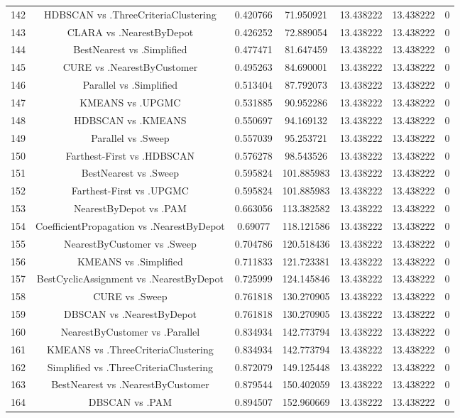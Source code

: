 \documentclass[a4paper,10pt]{article}
\begin{document}
\begin{landscape}
\begin{table}[!htp]
\begin{tabular}{ccccccc}
142&HDBSCAN vs .ThreeCriteriaClustering&0.420766&71.950921&13.438222&13.438222&0\\
143&CLARA vs .NearestByDepot&0.426252&72.889054&13.438222&13.438222&0\\
144&BestNearest vs .Simplified&0.477471&81.647459&13.438222&13.438222&0\\
145&CURE vs .NearestByCustomer&0.495263&84.690001&13.438222&13.438222&0\\
146&Parallel vs .Simplified&0.513404&87.792073&13.438222&13.438222&0\\
147&KMEANS vs .UPGMC&0.531885&90.952286&13.438222&13.438222&0\\
148&HDBSCAN vs .KMEANS&0.550697&94.169132&13.438222&13.438222&0\\
149&Parallel vs .Sweep&0.557039&95.253721&13.438222&13.438222&0\\
150&Farthest-First vs .HDBSCAN&0.576278&98.543526&13.438222&13.438222&0\\
151&BestNearest vs .Sweep&0.595824&101.885983&13.438222&13.438222&0\\
152&Farthest-First vs .UPGMC&0.595824&101.885983&13.438222&13.438222&0\\
153&NearestByDepot vs .PAM&0.663056&113.382582&13.438222&13.438222&0\\
154&CoefficientPropagation vs .NearestByDepot&0.69077&118.121586&13.438222&13.438222&0\\
155&NearestByCustomer vs .Sweep&0.704786&120.518436&13.438222&13.438222&0\\
156&KMEANS vs .Simplified&0.711833&121.723381&13.438222&13.438222&0\\
157&BestCyclicAssignment vs .NearestByDepot&0.725999&124.145846&13.438222&13.438222&0\\
158&CURE vs .Sweep&0.761818&130.270905&13.438222&13.438222&0\\
159&DBSCAN vs .NearestByDepot&0.761818&130.270905&13.438222&13.438222&0\\
160&NearestByCustomer vs .Parallel&0.834934&142.773794&13.438222&13.438222&0\\
161&KMEANS vs .ThreeCriteriaClustering&0.834934&142.773794&13.438222&13.438222&0\\
162&Simplified vs .ThreeCriteriaClustering&0.872079&149.125448&13.438222&13.438222&0\\
163&BestNearest vs .NearestByCustomer&0.879544&150.402059&13.438222&13.438222&0\\
164&DBSCAN vs .PAM&0.894507&152.960669&13.438222&13.438222&0\\

\end{tabular}
\end{table}
\end{landscape}
\end{document}
